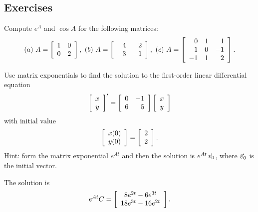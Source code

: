 \documentclass{ximera}
\author{Zack Reed}
\begin{document}
\begin{exercise}

    \section*{Exercises}

    \begin{exercise}
      Compute $e^A$ and $\cos A$ for the following matrices:
      \begin{equation*}
        (a)\quad
        A = \startmat{rr}
          1 & 0 \\
          0 & 2 \\
        \stopmat,
        \quad
        (b)\quad
        A = \startmat{rr}
          4  & 2  \\
          -3 & -1 \\
        \stopmat,
        \quad
        (c)\quad
        A = \startmat{rrr}
          0 & 1 & 1 \\
          1 & 0 & -1 \\
          -1 & 1 & 2 \\
        \stopmat.
      \end{equation*}
    \end{exercise}
    
    
    \begin{exercise}
      Use matrix exponentials to find the solution to the
      first-order linear differential equation
      \begin{equation*}
        \startmat{c}
          x \\
          y
        \stopmat^{\prime} = \startmat{rr}
          0 & -1 \\
          6 & 5
        \stopmat \startmat{c}
          x \\
          y
        \stopmat
      \end{equation*}
      with initial value
      \begin{equation*}
        \startmat{c}
          x(0) \\
          y(0)
        \stopmat = \startmat{r}
          2 \\
          2
        \stopmat.
      \end{equation*}
      Hint: form the matrix exponential $e^{At}$ and then the solution is
      $e^{At}\,\vect{v}_0$, where $\vect{v}_0$ is the initial vector.
      \begin{solution}
        The solution is
        \begin{equation*}
          e^{At}C = \startmat{c}
            8e^{2t} - 6e^{3t} \\
            18e^{3t} - 16e^{2t}
          \stopmat.
        \end{equation*}
      \end{solution}
    \end{exercise}
    

\end{exercise}
\end{document}
